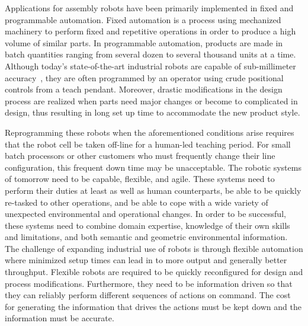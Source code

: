 Applications for assembly robots have been primarily implemented in fixed and programmable automation. Fixed automation is a process using mechanized machinery to perform fixed and repetitive operations in order to produce a high volume of similar parts. In programmable automation, products are made in batch quantities ranging from several dozen to several thousand units at a time. 
Although today's state-of-the-art industrial robots are capable of sub-millimeter accuracy~\cite{RobotAccuracy}, they are often programmed by an operator using crude positional controls from a teach pendant. Moreover, drastic modifications in the design process are realized when parts need major changes or become to complicated in design, thus resulting in long set up time to accommodate the new product style.

Reprogramming these robots when the aforementioned conditions arise requires that the robot cell be taken off-line for a human-led teaching period. For small batch processors or other customers who must frequently change their line configuration, this frequent down time may be unacceptable. The robotic systems of tomorrow need to be capable, flexible, and agile. These systems need to perform their duties at least as well as human counterparts, be able to be quickly re-tasked to other operations, and be able to cope with a wide variety of unexpected environmental and operational changes. In order to be successful, these systems need to combine domain expertise, knowledge of their own skills and limitations, and both semantic and geometric environmental information. The challenge of expanding industrial use of robots is through flexible automation where minimized setup times can lead in to more output and generally better throughput. Flexible robots are required to be quickly reconfigured for design and process modifications. Furthermore, they need to be information driven so that they can reliably perform different sequences of actions on command. The cost for generating the information that drives the actions must be kept down and the information must be accurate.

